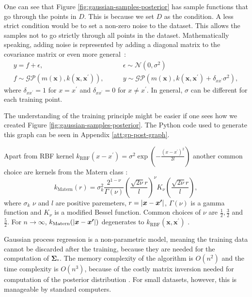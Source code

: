 One can see that Figure \ref{fig:gaussian-samples-posterior} has sample functions that go through the points in $D$. This is because we set $D$ as the condition. A less strict condition would be to set a non-zero noise to the dataset. This allows the samples not to go strictly through all points in the dataset. Mathematically speaking, adding noise is represented by adding a diagonal matrix to the covariance matrix or even more general~\cite{rasmussen2004}:
\begin{equation}
	\begin{split}
		y = f + \epsilon,& \quad  \quad \epsilon \sim \mathcal{N}(0, \sigma^2) \\
		f \sim \mathcal{GP}(m(\bm{x}),k(\bm{x},\bm{x}^\prime)), & \quad  \quad y \sim \mathcal{GP}(m(\bm{x}),k(\bm{x},\bm{x}^\prime)+\delta_{xx^\prime}\sigma^2),
	\end{split}
\end{equation}
where $\delta_{xx^\prime} = 1$ for $x=x^\prime$ and $\delta_{xx^\prime} = 0$ for $x\neq x^\prime$. In general, $\sigma$ can be different for each training point.

The understanding of the training principle might be easier if one sees how we created Figure \ref{fig:gaussian-samples-posterior}. The Python code used to generate this graph can be seen in Appendix \ref{att:gp-post-graph}.

Apart from RBF kernel $k_{\mathrm{RBF}}(x-x^\prime) =\sigma^2\exp(-\frac{(x-x^\prime)^2}{2l})$ another common choice are kernels from the Matern class \cite{rasmussen2005}:
\begin{equation}
	\label{eq:mattern-kernel}
	k_\mathrm{Matern}(r) = \sigma_k^2\frac{2^{1-\nu}}{\Gamma(\nu)}\left(\frac{\sqrt{2\nu}r}{l}\right)^\nu K_\nu\left(\frac{\sqrt{2\nu}r}{l}\right),
\end{equation}
where $\sigma_k$ $\nu$ and $l$ are positive paremeters, $r=\lvert \bm{x} -\bm{x^\prime} \rvert$, $\Gamma(\nu)$ is a gamma function and $K_\nu$ is a modified Bessel function. Common choices of $\nu$ are $\frac{1}{2}, \frac{3}{2}$ and $\frac{5}{2}$. For $n \rightarrow \infty$, $k_\mathrm{Matern}(\lvert \bm{x} -\bm{x^\prime} \rvert)$ degenerates to $k_{\mathrm{RBF}}(\bm{x} ,\bm{x^\prime})$ \cite{rasmussen2005}.

Gaussian process regression is a non-parametric model, meaning the training data cannot be discarded after the training, because they are needed for the computation of $\bm{\Sigma_*}$. The memory complexity of the algorithm is $O(n^2)$ and the time complexity is $O(n^3)$, because of the costly matrix inversion needed for computation of the posterior distribution \cite{rasmussen2004}. For small datasets, however, this is manageable by standard computers.

